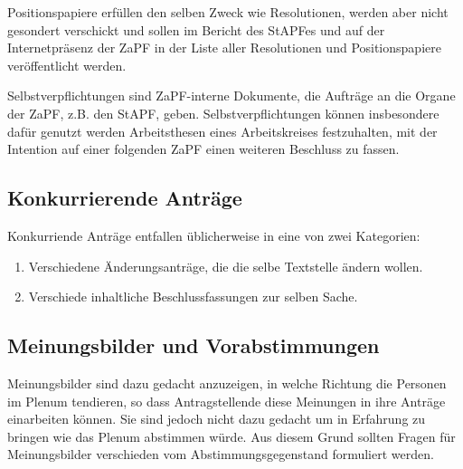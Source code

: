 \documentclass[
  a4paper,
  oneside]{scrartcl}
\providecommand{\tightlist}{%
  \setlength{\itemsep}{0pt}\setlength{\parskip}{0pt}}
\begin{document}
Positionspapiere erfüllen den selben Zweck wie Resolutionen, werden aber
nicht gesondert verschickt und sollen im Bericht des StAPFes und auf der
Internetpräsenz der ZaPF in der Liste aller Resolutionen und
Positionspapiere veröffentlicht werden.

Selbstverpflichtungen sind ZaPF-interne Dokumente, die Aufträge an die
Organe der ZaPF, z.B. den StAPF, geben. Selbstverpflichtungen können
insbesondere dafür genutzt werden Arbeitsthesen eines Arbeitskreises
festzuhalten, mit der Intention auf einer folgenden ZaPF einen weiteren
Beschluss zu fassen.

\subsection*{Konkurrierende Anträge}\label{konkurrierende-antruxe4ge}

Konkurriende Anträge entfallen üblicherweise in eine von zwei
Kategorien:

\begin{enumerate}
\def\labelenumi{\arabic{enumi}.}
\tightlist
\item
  Verschiedene Änderungsanträge, die die selbe Textstelle ändern wollen.
\item
  Verschiede inhaltliche Beschlussfassungen zur selben Sache.
\end{enumerate}

\subsection*{Meinungsbilder und
Vorabstimmungen}\label{meinungsbilder-und-vorabstimmungen}

Meinungsbilder sind dazu gedacht anzuzeigen, in welche Richtung die
Personen im Plenum tendieren, so dass Antragstellende diese Meinungen in
ihre Anträge einarbeiten können. Sie sind jedoch nicht dazu gedacht um
in Erfahrung zu bringen wie das Plenum abstimmen würde. Aus diesem Grund
sollten Fragen für Meinungsbilder verschieden vom Abstimmungsgegenstand
formuliert werden.
\end{document}
